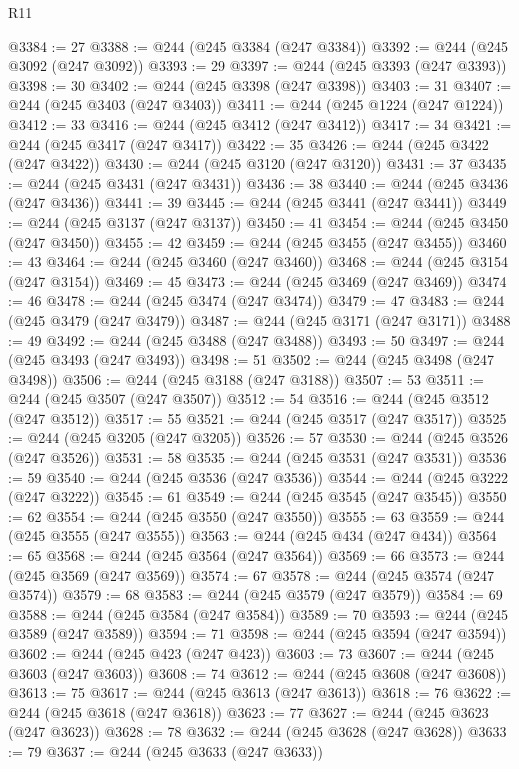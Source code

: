 \begin{lexlean}{R11}
\begin{coremodule}
@3384 := 27
@3388 := @244 (@245 @3384 (@247 @3384))
@3392 := @244 (@245 @3092 (@247 @3092))
@3393 := 29
@3397 := @244 (@245 @3393 (@247 @3393))
@3398 := 30
@3402 := @244 (@245 @3398 (@247 @3398))
@3403 := 31
@3407 := @244 (@245 @3403 (@247 @3403))
@3411 := @244 (@245 @1224 (@247 @1224))
@3412 := 33
@3416 := @244 (@245 @3412 (@247 @3412))
@3417 := 34
@3421 := @244 (@245 @3417 (@247 @3417))
@3422 := 35
@3426 := @244 (@245 @3422 (@247 @3422))
@3430 := @244 (@245 @3120 (@247 @3120))
@3431 := 37
@3435 := @244 (@245 @3431 (@247 @3431))
@3436 := 38
@3440 := @244 (@245 @3436 (@247 @3436))
@3441 := 39
@3445 := @244 (@245 @3441 (@247 @3441))
@3449 := @244 (@245 @3137 (@247 @3137))
@3450 := 41
@3454 := @244 (@245 @3450 (@247 @3450))
@3455 := 42
@3459 := @244 (@245 @3455 (@247 @3455))
@3460 := 43
@3464 := @244 (@245 @3460 (@247 @3460))
@3468 := @244 (@245 @3154 (@247 @3154))
@3469 := 45
@3473 := @244 (@245 @3469 (@247 @3469))
@3474 := 46
@3478 := @244 (@245 @3474 (@247 @3474))
@3479 := 47
@3483 := @244 (@245 @3479 (@247 @3479))
@3487 := @244 (@245 @3171 (@247 @3171))
@3488 := 49
@3492 := @244 (@245 @3488 (@247 @3488))
@3493 := 50
@3497 := @244 (@245 @3493 (@247 @3493))
@3498 := 51
@3502 := @244 (@245 @3498 (@247 @3498))
@3506 := @244 (@245 @3188 (@247 @3188))
@3507 := 53
@3511 := @244 (@245 @3507 (@247 @3507))
@3512 := 54
@3516 := @244 (@245 @3512 (@247 @3512))
@3517 := 55
@3521 := @244 (@245 @3517 (@247 @3517))
@3525 := @244 (@245 @3205 (@247 @3205))
@3526 := 57
@3530 := @244 (@245 @3526 (@247 @3526))
@3531 := 58
@3535 := @244 (@245 @3531 (@247 @3531))
@3536 := 59
@3540 := @244 (@245 @3536 (@247 @3536))
@3544 := @244 (@245 @3222 (@247 @3222))
@3545 := 61
@3549 := @244 (@245 @3545 (@247 @3545))
@3550 := 62
@3554 := @244 (@245 @3550 (@247 @3550))
@3555 := 63
@3559 := @244 (@245 @3555 (@247 @3555))
@3563 := @244 (@245 @434 (@247 @434))
@3564 := 65
@3568 := @244 (@245 @3564 (@247 @3564))
@3569 := 66
@3573 := @244 (@245 @3569 (@247 @3569))
@3574 := 67
@3578 := @244 (@245 @3574 (@247 @3574))
@3579 := 68
@3583 := @244 (@245 @3579 (@247 @3579))
@3584 := 69
@3588 := @244 (@245 @3584 (@247 @3584))
@3589 := 70
@3593 := @244 (@245 @3589 (@247 @3589))
@3594 := 71
@3598 := @244 (@245 @3594 (@247 @3594))
@3602 := @244 (@245 @423 (@247 @423))
@3603 := 73
@3607 := @244 (@245 @3603 (@247 @3603))
@3608 := 74
@3612 := @244 (@245 @3608 (@247 @3608))
@3613 := 75
@3617 := @244 (@245 @3613 (@247 @3613))
@3618 := 76
@3622 := @244 (@245 @3618 (@247 @3618))
@3623 := 77
@3627 := @244 (@245 @3623 (@247 @3623))
@3628 := 78
@3632 := @244 (@245 @3628 (@247 @3628))
@3633 := 79
@3637 := @244 (@245 @3633 (@247 @3633))

\end{coremodule}
\end{lexlean}
